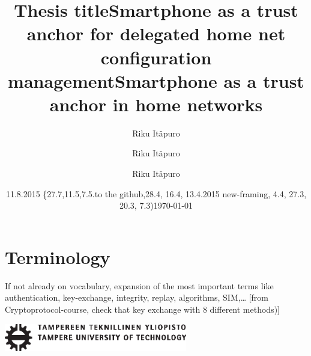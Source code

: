 \documentclass[12pt,a4paper,english]{tutthesis}
\author{Riku Itäpuro}
\title{Thesis title}      %
\author{Riku Itäpuro}
\title{Smartphone as a trust anchor for delegated home net configuration management}
\author{Riku Itäpuro}
\date{11.8.2015  \{27.7,11.5,7.5.to the github,28.4, 16.4, 13.4.2015 new-framing, 4.4, 27.3,  20.3, 7.3)}
\title{Smartphone as a trust anchor in home networks}
\begin{document}
\maketitle



\chapter*{Terminology}
\markboth{}{}                                %

If not already on vocabulary, expansion of the most important terms like
authentication, key-exchange, integrity, replay, algorithms, SIM,\ldots{}
[from Cryptoprotocol-course, check that key exchange with 8 different methods)]

\newpage             %

 \pagestyle{headings}
 \thispagestyle{empty}
\date\today
 \vspace*{-.5cm}\noindent
 \includegraphics[width=8cm]{tty_tut_logo}   %

\vspace{6.8cm}
\maketitle
\vspace{6.7cm} %
\end{document}

